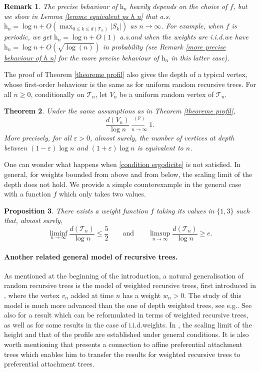 \documentclass[11pt]{article}
\newtheorem{theorem}{Theorem}[section]
\newtheorem{proposition}[theorem]{Proposition}
\newtheorem{remark}[theorem]{Remark}
\numberwithin{equation}{section}
\def\vp{\varepsilon}
\def \T{\mathcal{T}}
\def\P{\mathbb{P}}
\begin{document}
\begin{remark}The precise behaviour of $\mathrm{h}_n$ heavily depends on the choice of $f$, but we show in Lemma \ref{lemme equivalent ps h n} that a.s.\@ $\mathrm{h}_n = \log n+ O(\max_{0 \le k \le d(\T_n)} \vert S_k\vert)$ as $n\to \infty$. For example, when $f$ is periodic, we get $\mathrm{h}_n= \log n+O(1)$ a.s.\@ and when the weights are i.i.d.\@ we have $\mathrm{h}_n = \log n + O(\sqrt{\log (n) })$ in probability (see Remark \ref{more precise behaviour of h n} for the more precise behaviour of $\mathrm{h}_n$ in this latter case).
\end{remark}
The proof of Theorem \ref{theoreme profil} also gives the depth of a typical vertex, whose first-order behaviour is the same as for uniform random recursive trees. For all $n\ge 0$, conditionally on $\T_n$, let $V_n$ be a uniform random vertex of $\T_n$.
\begin{theorem}\label{th hauteur sommet typique}
	Under the same assumptions as in Theorem \ref{theoreme profil},
	\[
	\frac{d(V_n)}{\log n} \mathop{\longrightarrow}\limits_{n\to \infty}^{(\P)} 1.
	\]
	More precisely, for all $\vp>0$, almost surely, the number of vertices at depth between $(1-\vp)\log n $ and $(1+\vp )\log n $ is equivalent to $n$.
\end{theorem}

One can wonder what happens when \eqref{condition ergodicite} is not satisfied. In general, for weights bounded from above and from below, the scaling limit of the depth does not hold. We provide a simple counterexample in the general case with a function $f$ which only takes two values.
\begin{proposition}\label{lemme contre-exemple}
	There exists a weight function $f$ taking its values in $\{1,3\}$ such that, almost surely,
	\[
	\liminf_{n\to \infty} \frac{d(\T_n)}{\log n} \le \frac{5}{2}
	\qquad \text{and} \qquad \limsup_{n\to \infty} \frac{d(\T_n)}{\log n} \ge e.
	\]
\end{proposition}

\paragraph{Another related general model of recursive trees.} As mentioned at the beginning of the introduction, a natural generalisation of random recursive trees is the model of weighted recursive trees, first introduced in \cite{BV06}, where the vertex $v_n$ added at time $n$ has a weight $w_n>0$. The study of this model is much more advanced than the one of depth weighted trees, see e.g.\@ \cite{MU19, HI20, Sen21, PS22, PS24}. See also \cite{BMMU24} for a result which can be reformulated in terms of weighted recursive trees, as well as \cite{ELO23, Iye24, Lod24} for some results in the case of i.i.d.\@ weights. In \cite{Sen21}, the scaling limit of the height and that of the profile are established under general conditions. It is also worth mentioning that \cite{Sen21} presents a connection to affine preferential attachment trees which enables him to transfer the results for weighted recursive trees to preferential attachment trees.
\end{document}

